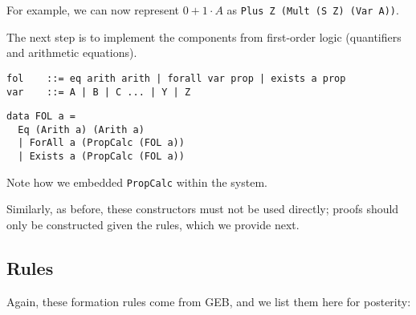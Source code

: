 \documentclass{article}
\begin{document}
For example, we can now represent $0 + 1 \cdot A$ as \texttt{Plus Z (Mult (S Z) (Var A))}.

The next step is to implement the components from first-order logic (quantifiers and arithmetic equations).

\begin{minipage}{0.49\textwidth}
\begin{lstlisting}
fol    ::= eq arith arith | forall var prop | exists a prop
var    ::= A | B | C ... | Y | Z
\end{lstlisting}
\end{minipage}
\begin{minipage}{0.49\textwidth}
\begin{lstlisting}
data FOL a =
  Eq (Arith a) (Arith a)
  | ForAll a (PropCalc (FOL a))
  | Exists a (PropCalc (FOL a))
\end{lstlisting}
\end{minipage}

Note how we embedded \texttt{PropCalc} within the system.

Similarly, as before, these constructors must not be used directly; proofs should only be constructed given the rules, which we provide next.

\subsection{Rules}

Again, these formation rules come from GEB, and we list them here for posterity:
\end{document}
